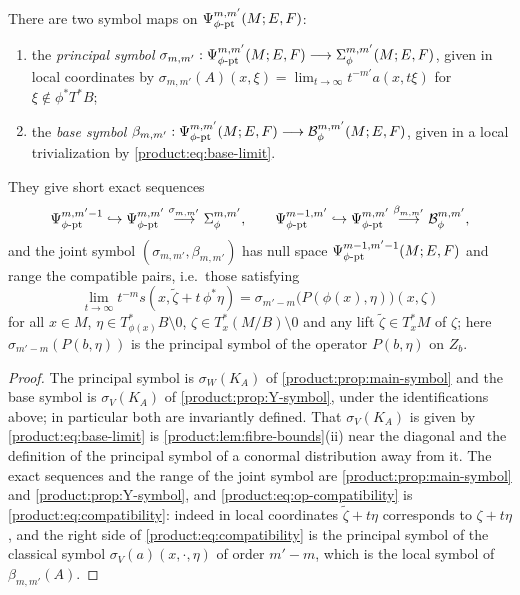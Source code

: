 \begin{theorem}\label{product:thm:symbols}
There are two symbol maps on $\Psi^{m,m'}_{\phi\text{-}\mathrm{pt}}(M;E,F)$:
\begin{enumerate}[label=\textup{(\roman*)}]
\item the \emph{principal symbol} $\sigma_{m,m'}:\Psi^{m,m'}_{\phi\text{-}\mathrm{pt}}(M;E,F)\longrightarrow
\Sigma^{m,m'}_{\phi}(M;E,F)$, given in local coordinates by
$\sigma_{m,m'}(A)(x,\xi)=\lim_{t\to\infty}t^{-m'}a(x,t\xi)$ for $\xi\notin\phi^*T^*B$;
\item the \emph{base symbol}
$\beta_{m,m'}:\Psi^{m,m'}_{\phi\text{-}\mathrm{pt}}(M;E,F)\longrightarrow\mathcal B^{m,m'}_\phi(M;E,F)$,
given in a local trivialization by \eqref{product:eq:base-limit}.
\end{enumerate}
They give short exact sequences
\begin{gather*}
\Psi^{m,m'-1}_{\phi\text{-}\mathrm{pt}}\hookrightarrow\Psi^{m,m'}_{\phi\text{-}\mathrm{pt}}\overset{\sigma_{m,m'}}\longrightarrow
\Sigma^{m,m'}_{\phi},\qquad
\Psi^{m-1,m'}_{\phi\text{-}\mathrm{pt}}\hookrightarrow\Psi^{m,m'}_{\phi\text{-}\mathrm{pt}}\overset{\beta_{m,m'}}\longrightarrow
\mathcal B^{m,m'}_\phi,
\end{gather*}
and the joint symbol $(\sigma_{m,m'},\beta_{m,m'})$ has null space
$\Psi^{m-1,m'-1}_{\phi\text{-}\mathrm{pt}}(M;E,F)$ and range the compatible pairs, i.e.\ those satisfying
\begin{equation}\label{product:eq:op-compatibility}
\lim_{t\to\infty}t^{-m}s(x,\tilde\zeta+t\,\phi^*\eta)=
\sigma_{m'-m}\big(P(\phi(x),\eta)\big)(x,\zeta)
\end{equation}
for all $x\in M$, $\eta\in T^*_{\phi(x)}B\setminus0$, $\zeta\in T^*_x(M/B)\setminus0$
and any lift $\tilde\zeta\in T^*_xM$ of $\zeta$; here $\sigma_{m'-m}(P(b,\eta))$ is
the principal symbol of the operator $P(b,\eta)$ on $Z_b$.
\end{theorem}

\begin{proof}
The principal symbol is $\sigma_W(K_A)$ of \cref{product:prop:main-symbol} and the
base symbol is $\sigma_V(K_A)$ of \cref{product:prop:Y-symbol}, under the
identifications above; in particular both are invariantly defined. That
$\sigma_V(K_A)$ is given by \eqref{product:eq:base-limit} is
\cref{product:lem:fibre-bounds}(ii) near the diagonal and the definition of the
principal symbol of a conormal distribution away from it. The exact sequences and
the range of the joint symbol are \cref{product:prop:main-symbol} and
\cref{product:prop:Y-symbol}, and \eqref{product:eq:op-compatibility} is
\eqref{product:eq:compatibility}: indeed in local coordinates $\tilde\zeta+t\eta$
corresponds to $\zeta+t\eta$, and the right side of
\eqref{product:eq:compatibility} is the principal symbol of the classical symbol
$\sigma_V(a)(x,\cdot,\eta)$ of order $m'-m$, which is the local symbol of
$\beta_{m,m'}(A)$.
\end{proof}

